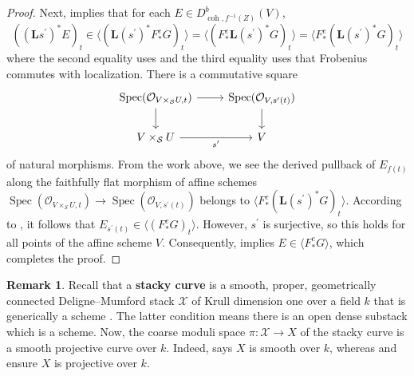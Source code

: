 \documentclass[11pt]{amsart}
\theoremstyle{plain}
\theoremstyle{definition}
\newtheorem{remark}[theorem]{Remark}
\numberwithin{equation}{section}
\numberwithin{theorem}{section}
\begin{document}
\begin{proof}
    Next,  implies that for each $E\in D^b_{\operatorname{coh},f^{-1}(Z)}(V)$, 
    \begin{displaymath}
        ((\mathbf{L} s^\prime)^\ast E)_t \in \langle (\mathbf{L} (s^\prime)^\ast F_\ast^e G)_t \rangle = \langle (F_\ast^e \mathbf{L} (s^\prime)^\ast G)_t \rangle = \langle F_\ast^e (\mathbf{L} (s^\prime)^\ast G)_t \rangle
    \end{displaymath}
    where the second equality uses  and the third equality uses that Frobenius commutes with localization.
    There is a commutative square
    \begin{displaymath}
        \begin{tikzcd}
            {\operatorname{Spec}(\mathcal{O}_{V\times_\mathcal{S} U,t})} & {\operatorname{Spec}(\mathcal{O}_{V,s^\prime(t)})} \\
            {V\times_\mathcal{S} U} & V
            \arrow[from=1-1, to=1-2]
            \arrow[from=1-1, to=2-1]
            \arrow[from=1-2, to=2-2]
            \arrow["{s^\prime}"', from=2-1, to=2-2]
        \end{tikzcd}
    \end{displaymath} 
    of natural morphisms. 
    From the work above, we see the derived pullback of $E_{f(t)}$ along the faithfully flat morphism of affine schemes $\operatorname{Spec}(\mathcal{O}_{V\times_\mathcal{S} U,t}) \to \operatorname{Spec}(\mathcal{O}_{V,s^\prime(t)})$ belongs to $\langle F_\ast^e (\mathbf{L} (s^\prime)^\ast G)_t \rangle$. 
    According to \cite[Corollary 2.16]{Letz:2021}, it follows that $E_{s^\prime(t)} \in \langle (F_\ast^e G)_t \rangle$. 
    However, $s^\prime$ is surjective, so this holds for all points of the affine scheme $V$. 
    Consequently, \cite[Theorem 3.6]{Letz:2021} implies $E \in \langle F_\ast^e G \rangle$, which completes the proof.
\end{proof}

\begin{remark}
    \label{rmk:stacky_curve}
    Recall that a \textbf{stacky curve} is a smooth, proper, geometrically connected Deligne--Mumford
    stack $\mathcal{X}$ of Krull dimension one over a field $k$ that is generically a scheme \cite[Definition 5.2.1]{Voight/Zureick-Brown:2022}. The latter condition means there is an open dense substack which is a scheme. 
    Now, the coarse moduli space $\pi\colon \mathcal{X} \to X$ of the stacky curve is a smooth projective curve over $k$. 
    Indeed, \cite[Lemma 5.3.4]{Voight/Zureick-Brown:2022} says $X$ is smooth over $k$, whereas \cite[Theorem 6.12]{Rydh:2013} and \cite[\href{https://stacks.math.columbia.edu/tag/0A26}{Tag 0A26}]{stacks-project} ensure $X$ is projective over $k$. 
\end{remark}
\end{document}
